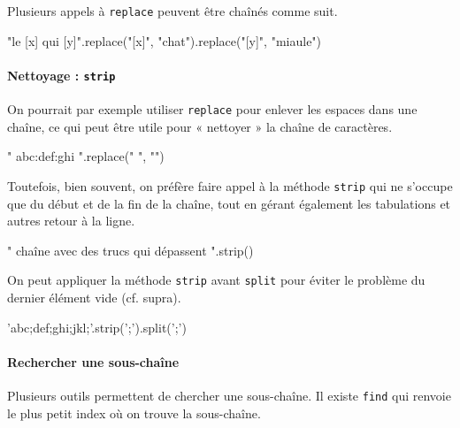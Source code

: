 Plusieurs appels à \texttt{replace} peuvent être chaînés comme suit.

\begin{idleconsole}
	\begin{pyconsole}
		"le [x] qui [y]".replace("[x]", "chat").replace("[y]", "miaule")
	\end{pyconsole}
\end{idleconsole}

\vspace{1pt}

\paragraph{Nettoyage : {\normalfont\texttt{strip}}}
On pourrait par exemple utiliser \texttt{replace} pour enlever les espaces dans une chaîne, ce qui peut être utile pour « nettoyer » la chaîne de caractères.

\begin{idleconsole}
	\begin{pyconsole}
		" abc:def:ghi ".replace(" ", "")
	\end{pyconsole}
\end{idleconsole}

Toutefois, bien souvent, on préfère faire appel à la méthode \texttt{strip} qui ne s'occupe que du début et de la fin de la chaîne, tout en gérant également les tabulations et autres retour à la ligne.

\begin{idleconsole}
	\begin{pyconsole}
		" \tune chaîne avec des trucs qui dépassent \n".strip()
	\end{pyconsole}
\end{idleconsole}

On peut appliquer la méthode \texttt{strip} avant \texttt{split} pour éviter le problème du dernier élément vide (cf. supra).

\begin{idleconsole}
	\begin{pyconsole}
		'abc;def;ghi;jkl;'.strip(';').split(';')
	\end{pyconsole}
\end{idleconsole}

\vspace{-1pt}%

\paragraph{Rechercher une sous-chaîne}
Plusieurs outils permettent de chercher une sous-chaîne. Il existe \texttt{find} qui renvoie le plus petit index où on trouve la sous-chaîne.

